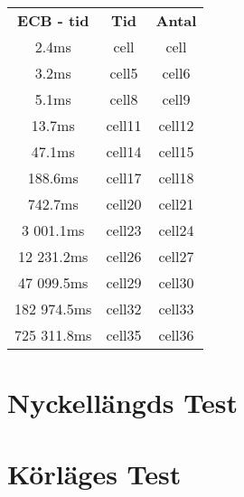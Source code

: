 
\begin{center}
  \begin{tabular}{ |c|c|c| } 
   \hline
   \bfseries{ECB - tid} & \bfseries{Tid} & \bfseries{Antal} \\
   2.4ms & cell & cell \\
   3.2ms & cell5 & cell6 \\
   5.1ms & cell8 & cell9 \\
   13.7ms & cell11 & cell12 \\
   47.1ms & cell14 & cell15 \\
   188.6ms & cell17 & cell18 \\
   742.7ms & cell20 & cell21 \\
   3 001.1ms & cell23 & cell24 \\
   12 231.2ms & cell26 & cell27 \\
   47 099.5ms & cell29 & cell30 \\
   182 974.5ms & cell32 & cell33 \\
   725 311.8ms & cell35 & cell36 \\
   \hline
  \end{tabular}
  \end{center}

\section{Nyckellängds Test}


\section{Körläges Test}


